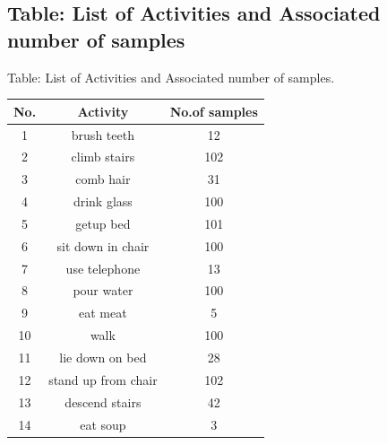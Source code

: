 \documentclass{beamer}
\begin{document}
\subsection{Table: List of Activities and Associated number of samples}
\begin{frame}{Table: List of Activities and Associated number of samples.}
    \begin{table}[h]
        \centering
        \begin{tabular}{|c|c|c|}
        \hline
            No. & Activity & No.of samples\\\hline
            1 & brush teeth &12 \\\hline
            2 & climb stairs & 102\\\hline
            3 & comb hair & 31\\\hline
            4 & drink glass & 100\\\hline
            5 & getup bed & 101\\\hline
            6 & sit down in chair & 100\\\hline
            7 & use telephone & 13\\\hline
            8 & pour water & 100\\\hline
            9 & eat meat & 5\\\hline
            10 & walk & 100\\\hline
            11 & lie down on bed & 28\\\hline
            12 & stand up from chair & 102\\\hline
            13 & descend stairs & 42\\\hline
            14 & eat soup & 3\\\hline
        \end{tabular}
        
    \end{table}
\end{frame}
\end{document}

